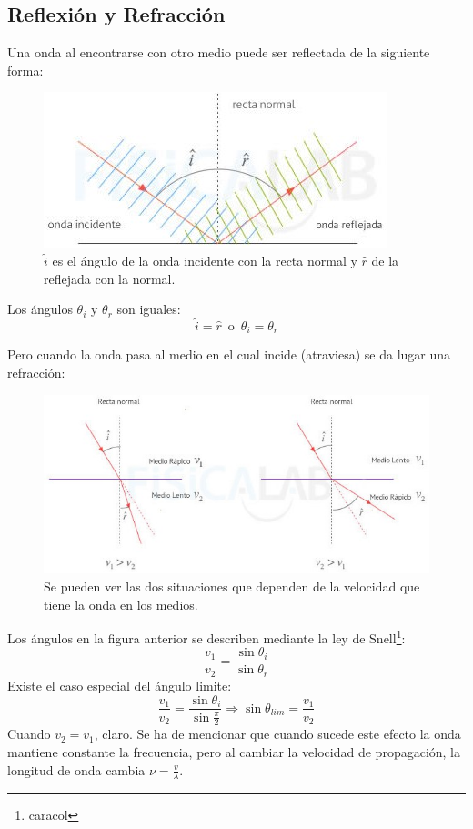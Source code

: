 \documentclass[arial,a4paper,print]{article}
\begin{document}
\subsection{Reflexión y Refracción}
Una onda al encontrarse con otro medio puede ser reflectada de la siguiente forma:
\begin{figure}[H]
	\centering
	\includegraphics[width=0.4\linewidth]{figures/onda-reflejada}
	\caption{$\hat{i}$ es el ángulo de la onda incidente con la recta normal y $\hat{r}$ de la reflejada con la normal.}
	\label{fig:onda-reflejada}
\end{figure}
Los ángulos $\theta_i$ y $\theta_r$ son iguales:
\begin{equation*}
	\hat{i}=\hat{r}\, \text{ o } \,\theta_i = \theta_r
\end{equation*}

Pero cuando la onda pasa al medio en el cual incide (atraviesa) se da lugar una refracción:
\begin{figure}[h]
		\centering
		\includegraphics[width=.5\textwidth]{figures/refraccion-ondas1}
		\caption{Se pueden ver las dos situaciones que dependen de la velocidad que tiene la onda en los medios.}
		\label{fig:refraccion1}
\end{figure}

Los ángulos en la figura anterior se describen mediante la ley de Snell\footnote{caracol}:
\begin{equation*}
	\frac{v_{1}}{v_{2}} = \frac{\sin\theta_i}{\sin\theta_r}
\end{equation*}
Existe el caso especial del ángulo limite:
\begin{equation*}
	\frac{v_{1}}{v_{2}} = \frac{\sin\theta_i}{\sin\frac\pi2} \Rightarrow \sin\theta_{lim} = \frac{v_{1}}{v_{2}}
\end{equation*} 
Cuando $v_{2} = v_{1}$, claro. Se ha de mencionar que cuando sucede este efecto la onda mantiene constante la frecuencia, pero al cambiar la velocidad de propagación, la longitud de onda cambia $\nu = \frac v\lambda$. 
\end{document}
